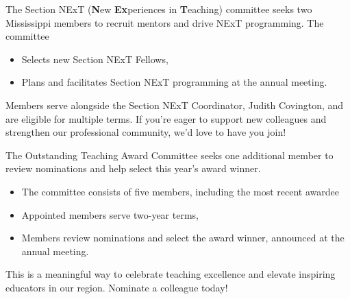 \documentclass[10pt]{article} %
\begin{document}
\begin{minipage}[t]{\linewidth}
\begin{minipage}{.5\textwidth}
\begin{mdframed}[style=intextbox,frametitle={}]
      \hypertarget{nextcommittee}{} %
      The Section NExT (\textbf{N}ew \textbf{Ex}periences in \textbf{T}eaching) committee seeks two Mississippi members to recruit mentors and drive NExT programming.
      The committee
      \begin{itemize}
      \item
        Selects new Section NExT Fellows,
      \item
	Plans and facilitates Section NExT programming at the annual meeting.
      \end{itemize}
      Members serve alongside the Section NExT Coordinator, Judith Covington, and are eligible for multiple terms.
      If you’re eager to support new colleagues and strengthen our professional community, we’d love to have you join!
      \BackToContents %

    \end{mdframed}
  \end{minipage}
  \begin{minipage}{.5\textwidth}
    \begin{mdframed}[style=intextbox,frametitle={}] %

      \hypertarget{teacherawardcommittee}{} %
      The Outstanding Teaching Award Committee seeks one additional member to review nominations and help select this year’s award winner.
      \begin{itemize}
      \item
        The committee consists of five members, including the most recent awardee
      \item
        Appointed members serve two-year terms,
      \item
        Members review nominations and select the award winner, announced at the annual meeting.
      \end{itemize}
      This is a meaningful way to celebrate teaching excellence and elevate inspiring educators in our region. Nominate a colleague today!
      \BackToContents %

    \end{mdframed}
  \end{minipage}



\end{minipage}
\end{document}
